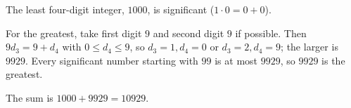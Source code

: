 The least four-digit integer, $1000$, is significant ($1\cdot0=0+0$).

For the greatest, take first digit $9$ and second digit $9$ if possible. Then $9d_3=9+d_4$ with $0\le d_4\le9$, so $d_3=1,d_4=0$ or $d_3=2,d_4=9$; the larger is $9929$. Every significant number starting with $99$ is at most $9929$, so $9929$ is the greatest.

The sum is $1000+9929=\boxed{10929}$.
